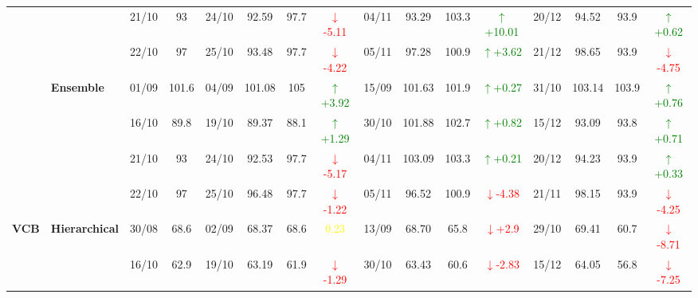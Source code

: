 \documentclass{ieeeaccess}
\begin{document}
{\begin{longtable}{llcc|cccc|cccc|cccc}
&
& 21/10 & 93 & 24/10 & 92.59 & 97.7 & \textcolor{red}{\(\downarrow\)-5.11} & 04/11 & 93.29 & 103.3 & \textcolor{green}{\(\uparrow\)+10.01} & 20/12 & 94.52 & 93.9 & \textcolor{green}{\(\uparrow\)+0.62} \\

&
& 22/10 & 97 & 25/10 & 93.48 & 97.7 & \textcolor{red}{\(\downarrow\)-4.22} & 05/11 & 97.28 & 100.9 & \textcolor{green}{\(\uparrow\)+3.62} & 21/12 & 98.65 & 93.9 & \textcolor{red}{\(\downarrow\)-4.75} \\
\cmidrule(lr){2-16}



& \textbf{Ensemble}
& 01/09 & 101.6 & 04/09 & 101.08 & 105 & \textcolor{green}{\(\uparrow\)+3.92} & 15/09 & 101.63 & 101.9 & \textcolor{green}{\(\uparrow\)+0.27} & 31/10 & 103.14 & 103.9 & \textcolor{green}{\(\uparrow\)+0.76} \\

&
& 16/10 & 89.8 & 19/10 & 89.37 & 88.1 & \textcolor{green}{\(\uparrow\)+1.29} & 30/10 & 101.88 & 102.7 & \textcolor{green}{\(\uparrow\)+0.82} & 15/12 & 93.09 & 93.8 & \textcolor{green}{\(\uparrow\)+0.71} \\

&
& 21/10 & 93 & 24/10 & 92.53 & 97.7 & \textcolor{red}{\(\downarrow\)-5.17} & 04/11 & 103.09 & 103.3 & \textcolor{green}{\(\uparrow\)+0.21} & 20/12 & 94.23 & 93.9 & \textcolor{green}{\(\uparrow\)+0.33} \\

&
& 22/10 & 97 & 25/10 & 96.48 & 97.7 & \textcolor{red}{\(\downarrow\)-1.22} & 05/11 & 96.52 & 100.9 & \textcolor{red}{\(\downarrow\)-4.38} & 21/11 & 98.15 & 93.9 & \textcolor{red}{\(\downarrow\)-4.25} \\
\midrule




\multirow{12}{*}{\textbf{VCB}} 
& \textbf{Hierarchical}
& 30/08 & 68.6 & 02/09 & 68.37 & 68.6 & \textcolor{yellow}{0.23} & 13/09 & 68.70 & 65.8 & \textcolor{red}{\(\downarrow\)+2.9} & 29/10 & 69.41 & 60.7 & \textcolor{red}{\(\downarrow\)-8.71} \\

&
& 16/10 & 62.9 & 19/10 & 63.19 & 61.9 & \textcolor{red}{\(\downarrow\)-1.29} & 30/10 & 63.43 & 60.6 & \textcolor{red}{\(\downarrow\)-2.83} & 15/12 & 64.05 & 56.8 & \textcolor{red}{\(\downarrow\)-7.25} \\


\end{longtable}}
\end{document}
